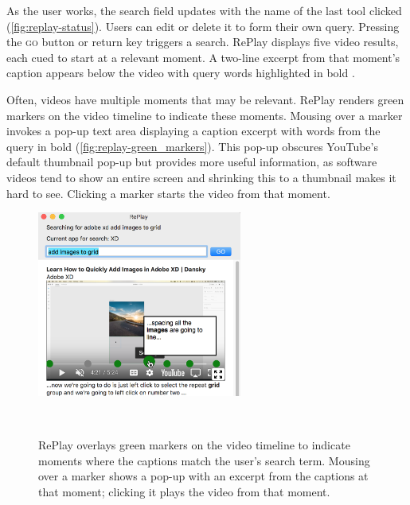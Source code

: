 As the user works, the search field updates with the name of the last tool clicked (\autoref{fig:replay-status}). Users can edit or delete it to form their own query. Pressing the \textsc{go} button or return key triggers a search. RePlay displays five video results, each cued to start at a relevant moment. A two-line excerpt from that moment's caption appears below the video with query words highlighted in bold \cite{Hearst2009Book}.

Often, videos have multiple moments that may be relevant. RePlay renders green markers on the video timeline to indicate these moments. Mousing over a marker invokes a pop-up text area displaying a caption excerpt with words from the query in bold (\autoref{fig:replay-green_markers}). This pop-up obscures YouTube's default thumbnail pop-up but provides more useful information, as software videos tend to show an entire screen and shrinking this to a thumbnail makes it hard to see. Clicking a marker starts the video from that moment. 

\begin{figure}[b!]
\centering
  \includegraphics[width=0.6\textwidth]{replay/figures/green_markers.png}
  \caption{RePlay overlays green markers on the video timeline to indicate moments where the captions match the user's search term. Mousing over a marker shows a pop-up with an excerpt from the captions at that moment; clicking it plays the video from that moment. }~\label{fig:replay-green_markers}
\end{figure}

